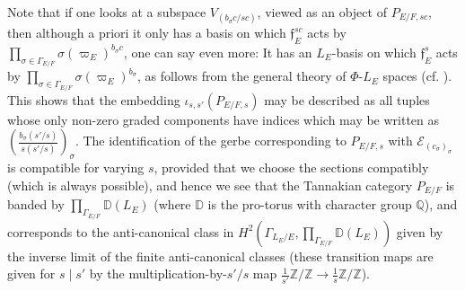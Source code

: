 \documentclass[11pt]{amsart}
\theoremstyle{definition}
\newcommand{\mc}{\mathcal}
\newcommand{\Z}{\mathbb{Z}}
\newcommand{\Q}{\mathbb{Q}}
\newcommand{\mf}{\mathfrak}
\newcommand{\D}{\mathbb{D}}
\begin{document}
Note that if one looks at a subspace $V_{(b_{\sigma}c/sc)}$, viewed as an object of $P_{E/F,sc}$, then although a priori it only has a basis on which $\mf{f}_{E}^{sc}$ acts by $\prod_{\sigma \in \Gamma_{E/F}} \sigma(\varpi_{E})^{b_{\sigma}c}$, one can say even more: It has an $L_{E}$-basis on which $\mf{f}_{E}^{s}$ acts by $\prod_{\sigma \in \Gamma_{E/F}} \sigma(\varpi_{E})^{ b_{\sigma}}$, as follows from the general theory of $\Phi$-$L_{E}$ spaces (cf. \cite[p.11]{Kottwitzisoci}). This shows that the embedding $\iota_{s,s'}(P_{E/F,s})$ may be described as all tuples whose only non-zero graded components have indices which may be written as $(\frac{b_{\sigma}(s'/s)}{s(s'/s)})_{\sigma}$. The identification of the gerbe corresponding to $P_{E/F,s}$ with $\mc{E}_{(c_{\sigma})_{\sigma}}$ is compatible for varying $s$, provided that we choose the sections compatibly (which is always possible), and hence we see that the Tannakian category $P_{E/F}$ is banded by $\prod_{\Gamma_{E/F}} \mathbb{D}(L_{E})$ (where $\D$ is the pro-torus with character group $\Q$), and corresponds to the anti-canonical class in $H^{2}(\Gamma_{L_{E}/E}, \prod_{\Gamma_{E/F}} \mathbb{D}(L_{E}))$ given by the inverse limit of the finite anti-canonical classes (these transition maps are given for $s \mid s'$ by the multiplication-by-$s'/s$ map $\frac{1}{s'}\Z/\Z \to \frac{1}{s}\Z/\Z$). 
\end{document}
